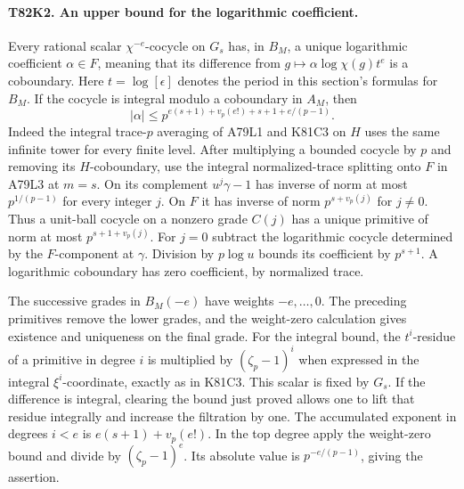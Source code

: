 \paragraph{T82K2. An upper bound for the logarithmic coefficient.}
Every rational scalar $\chi^{-e}$-cocycle on $G_s$ has, in $B_M$,
a unique logarithmic coefficient $\alpha\in F$, meaning that its
difference from $g\mapsto\alpha\log\chi(g)t^e$ is a coboundary.
Here $t=\log[\epsilon]$ denotes the period in this section's
formulas for $B_M$. If the cocycle is integral modulo a coboundary
in $A_M$, then
\[
                   |\alpha|\le p^{e(s+1)+v_p(e!)+s+1+e/(p-1)} .
\]
Indeed the integral trace-$p$ averaging of A79L1 and K81C3 on $H$
uses the same infinite tower for every finite level. After multiplying
a bounded cocycle by $p$ and removing its $H$-coboundary, use the
integral normalized-trace splitting onto $F$ in A79L3 at $m=s$.
On its complement $u^j\gamma-1$ has inverse of norm at most
$p^{1/(p-1)}$ for every integer $j$. On $F$ it has inverse of norm
$p^{s+v_p(j)}$ for $j\ne0$. Thus a unit-ball cocycle on a nonzero
grade $C(j)$ has a unique primitive of norm at most $p^{s+1+v_p(j)}$.
For $j=0$ subtract the logarithmic cocycle determined by the
$F$-component at $\gamma$. Division by $p\log u$ bounds its
coefficient by $p^{s+1}$. A logarithmic coboundary has zero
coefficient, by normalized trace.

The successive grades in $B_M(-e)$ have weights $-e,\ldots,0$.
The preceding primitives remove the lower grades, and the weight-zero
calculation gives existence and uniqueness on the final grade. For the
integral bound, the $t^i$-residue of a primitive in degree $i$ is
multiplied by $(\zeta_p-1)^i$ when expressed in the integral
$\xi^i$-coordinate, exactly as in K81C3. This scalar is fixed by
$G_s$. If the difference is integral, clearing the bound just proved
allows one to lift that residue integrally and increase the filtration
by one. The accumulated exponent in degrees $i<e$ is
$e(s+1)+v_p(e!)$. In the top degree apply the weight-zero bound and
divide by $(\zeta_p-1)^e$. Its absolute value is $p^{-e/(p-1)}$,
giving the assertion.

